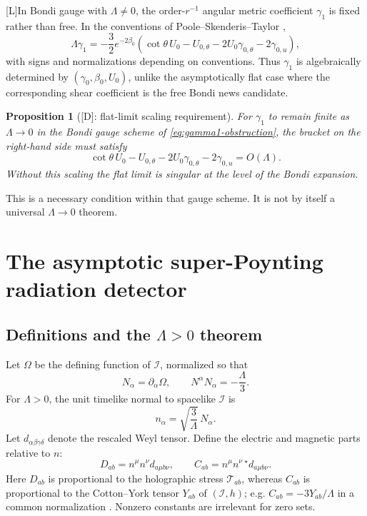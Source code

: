 \documentclass[11pt,a4paper]{article}
\newtheorem{proposition}[theorem]{Proposition}
\newcommand{\scri}{\mathscr{I}}
\newcommand{\cT}{\mathcal{T}}
\newcommand{\statusL}{\textsf{[L]}}
\newcommand{\statusD}{\textsf{[D]}}
\begin{document}
\statusL In Bondi gauge with \(\Lambda\neq0\), the order-\(r^{-1}\) angular metric coefficient \(\gamma_1\) is fixed rather than free.  In the conventions of Poole--Skenderis--Taylor \cite{poole2019bondi},
\begin{equation}\label{eq:gamma1-obstruction}
  \Lambda\gamma_1
  =
  -\frac32 e^{-2\beta_0}
  \left(
    \cot\theta\,U_0
    -U_{0,\theta}
    -2U_0\gamma_{0,\theta}
    -2\gamma_{0,u}
  \right),
\end{equation}
with signs and normalizations depending on conventions.  Thus \(\gamma_1\) is algebraically determined by \((\gamma_0,\beta_0,U_0)\), unlike the asymptotically flat case where the corresponding shear coefficient is the free Bondi news candidate.

\begin{proposition}[\statusD: flat-limit scaling requirement]
For \(\gamma_1\) to remain finite as \(\Lambda\to0\) in the Bondi gauge scheme of \eqref{eq:gamma1-obstruction}, the bracket on the right-hand side must satisfy
\begin{equation}
  \cot\theta\,U_0-U_{0,\theta}-2U_0\gamma_{0,\theta}-2\gamma_{0,u}
  =
  O(\Lambda).
\end{equation}
Without this scaling the flat limit is singular at the level of the Bondi expansion.
\end{proposition}

This is a necessary condition within that gauge scheme.  It is not by itself a universal \(\Lambda\to0\) theorem.

\section{The asymptotic super-Poynting radiation detector}

\subsection{Definitions and the \(\Lambda>0\) theorem}

Let \(\Omega\) be the defining function of \(\scri\), normalized so that
\begin{equation}
  N_\alpha=\partial_\alpha\Omega,
  \qquad
  N^\alpha N_\alpha=-\frac{\Lambda}{3}.
\end{equation}
For \(\Lambda>0\), the unit timelike normal to spacelike \(\scri\) is
\begin{equation}
  n_\alpha=\sqrt{\frac{3}{\Lambda}}\,N_\alpha .
\end{equation}
Let \(d_{\alpha\beta\gamma\delta}\) denote the rescaled Weyl tensor.  Define the electric and magnetic parts relative to \(n\):
\begin{equation}
  D_{ab}=n^\mu n^\nu d_{a\mu b\nu},
  \qquad
  C_{ab}=n^\mu n^\nu\,{}^\star d_{a\mu b\nu}.
\end{equation}
Here \(D_{ab}\) is proportional to the holographic stress \(\cT_{ab}\), whereas \(C_{ab}\) is proportional to the Cotton--York tensor \(Y_{ab}\) of \((\scri,h)\); e.g. \(C_{ab}=-3Y_{ab}/\Lambda\) in a common normalization \cite{fabSen2025characterization}.  Nonzero constants are irrelevant for zero sets.
\end{document}
